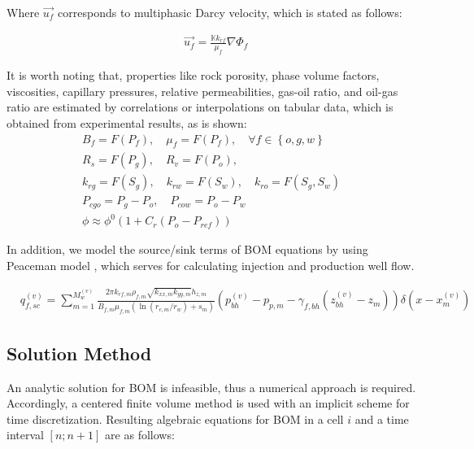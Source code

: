 \documentclass[review]{elsarticle}
\begin{document}
Where $\vec{u_{f}}$ corresponds to multiphasic Darcy velocity, which is stated as follows: 

\begin{align}
	\label{ec:Darcy}
	&\vec{u_{f}} =\frac{\mathbb{K} k_{rf}}{\mu_{f} } \nabla{\Phi_{f}}
\end{align} 

It is worth noting that, properties like rock porosity, phase volume factors, viscosities, capillary pressures, relative permeabilities, gas-oil ratio, and oil-gas ratio are estimated by correlations or interpolations on tabular data, which is obtained from experimental results, as is shown:
\begin{equation}
	\begin{aligned}
	B_{f}= F(P_{f}), \quad
	\mu_{f}= F(P_{f}), \quad \forall f \in \left\lbrace o,g,w\right\rbrace  \\
	R_{s} = F(P_{g}), \quad
	R_{v} = F(P_{o}), \qquad\qquad\\
	k_{rg} = F(S_{g}), \quad
	k_{rw} = F(S_{w}), \quad
	k_{ro} = F(S_{g},S_{w}) \\
	P_{cgo} = P_g - P_o, \quad P_{cow} = P_o - P_w\qquad\\
	\phi \approx \phi^{0}(1+ C_{r}(P_{o}-P_{ref})) \qquad\qquad 
	\end{aligned}
\end{equation}

In addition, we model the source/sink terms of BOM equations by using Peaceman model \cite{peaceman1983interpretation}, which serves for calculating injection and production well flow.

\begin{footnotesize}
	\begin{align}
	\label{ec:peaceman}&q^{(v)}_{f, sc} = \sum_{m=1}^{M^{(v)}_{w}}\frac{2\pi k_{rf,m} \rho_{f,m} \sqrt{k_{xx,m}k_{yy,m}}h_{z,m}}{B_{f,m}\mu_{f,m}\left(\ln \left(r_{e,m}/r_{w}\right) +s_{m}\right)}\left(p_{bh}^{(v)}-p_{p,m}-\gamma_{f,bh}\left(z_{bh}^{(v)}-z_{m}\right)\right)\delta\left(x-x_{m}^{(v)}\right)
	\end{align}
\end{footnotesize}

\subsection{Solution Method}
An analytic solution for BOM is infeasible, thus a numerical approach is required. Accordingly, a centered finite volume method is used with an implicit scheme for time discretization. Resulting algebraic equations for BOM in a cell $i$ and a time interval $\left[n;n+1 \right] $ are as follows:
\end{document}
